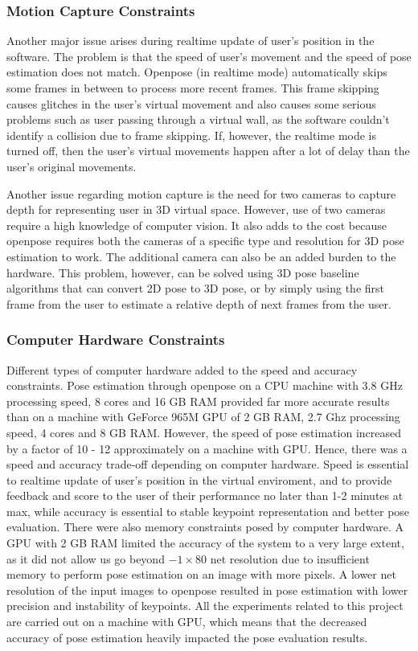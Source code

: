 \subsubsection{Motion Capture Constraints}

Another major issue arises during realtime update of user's position in the software. The problem is that the speed of user's movement and the speed of pose estimation does not match. Openpose (in realtime mode) automatically skips some frames in between to process more recent frames. This frame skipping causes glitches in the user's virtual movement and also causes some serious problems such as user passing through a virtual wall, as the software couldn't identify a collision due to frame skipping. If, however, the realtime mode is turned off, then the user's virtual movements happen after a lot of delay than the user's original movements. 


Another issue regarding motion capture is the need for two cameras to capture depth for representing user in 3D virtual space. However, use of two cameras require a high knowledge of computer vision. It also adds to the cost because openpose requires both the cameras of a specific type and resolution for 3D pose estimation to work. The additional camera can also be an added burden to the hardware. This problem, however, can be solved using 3D pose baseline algorithms that can convert 2D pose to 3D pose, or by simply using the first frame from the user to estimate a relative depth of next frames from the user. 

\subsubsection{Computer Hardware Constraints}
Different types of computer hardware added to the speed and accuracy constraints. Pose estimation through openpose on a CPU machine with 3.8 GHz processing speed, 8 cores and 16 GB RAM provided far more accurate results than on a machine with GeForce 965M GPU of 2 GB RAM, 2.7 Ghz processing speed, 4 cores and 8 GB RAM. However, the speed of pose estimation increased by a factor of 10 - 12 approximately on a machine with GPU. Hence, there was a speed and accuracy trade-off depending on computer hardware. Speed is essential to realtime update of user's position in the virtual enviroment, and to provide feedback and score to the user of their performance no later than 1-2 minutes at max, while accuracy is essential to stable keypoint representation and better pose evaluation. There were also memory constraints posed by computer hardware. A GPU with 2 GB RAM limited the accuracy of the system to a very large extent, as it did not allow us go beyond $-1 \times 80$ net resolution due to insufficient memory to perform pose estimation on an image with more pixels. A lower net resolution of the input images to openpose resulted in pose estimation with lower precision and instability of keypoints. All the experiments related to this project are carried out on a machine with GPU, which means that the decreased accuracy of pose estimation heavily impacted the pose evaluation results. 


